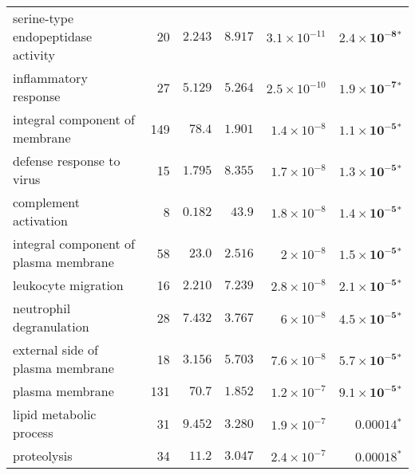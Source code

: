 \begin{longtable}{|l|r|r|r|r|r|}
    serine-type endopeptidase activity                    & 20                      & $ 2.243$                & $ 8.917$   & $3.1\times 10^{-11}$ & $\bm{2.4\times 10^{-8}{^*}}$    \\
    inflammatory response                                 & 27                      & $ 5.129$                & $ 5.264$   & $2.5\times 10^{-10}$ & $\bm{1.9\times 10^{-7}{^*}}$    \\
    integral component of membrane                        & 149                     & $  78.4$                  & $ 1.901$   & $1.4\times 10^{-8}$  & $\bm{1.1\times 10^{-5}{^*}}$    \\
    defense response to virus                             & 15                      & $ 1.795$                & $ 8.355$   & $1.7\times 10^{-8}$  & $\bm{1.3\times 10^{-5}{^*}}$    \\
    complement activation                                 & 8                       & $ 0.182$                & $  43.9$     & $1.8\times 10^{-8}$  & $\bm{1.4\times 10^{-5}{^*}}$    \\
    integral component of plasma membrane                 & 58                      & $  23.0$                  & $ 2.516$   & $ 2\times 10^{-8}$   & $\bm{1.5\times 10^{-5}{^*}}$    \\
    leukocyte migration                                   & 16                      & $ 2.210$                & $ 7.239$   & $2.8\times 10^{-8}$  & $\bm{2.1\times 10^{-5}{^*}}$    \\
    neutrophil degranulation                              & 28                      & $ 7.432$                & $ 3.767$   & $ 6\times 10^{-8}$   & $\bm{4.5\times 10^{-5}{^*}}$    \\
    external side of plasma membrane                      & 18                      & $ 3.156$                & $ 5.703$   & $7.6\times 10^{-8}$  & $\bm{5.7\times 10^{-5}{^*}}$    \\
    plasma membrane                                       & 131                     & $  70.7$                  & $ 1.852$   & $1.2\times 10^{-7}$  & $\bm{9.1\times 10^{-5}{^*}}$    \\
    lipid metabolic process                               & 31                      & $ 9.452$                & $ 3.280$   & $1.9\times 10^{-7}$  & $\bm{0.00014{^*}}$              \\
    proteolysis                                           & 34                      & $  11.2$                  & $ 3.047$   & $2.4\times 10^{-7}$  & $\bm{0.00018{^*}}$              \\

\end{longtable}
